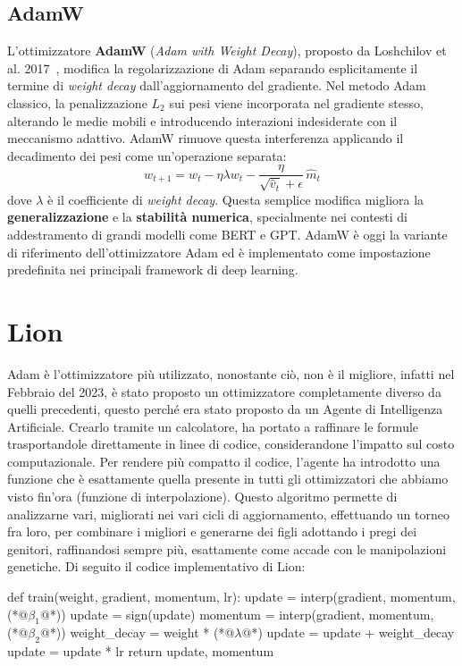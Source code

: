 \subsection{AdamW}

L’ottimizzatore \textbf{AdamW} (\emph{Adam with Weight Decay}), proposto da Loshchilov et al. 2017~\cite{LoshchilovHutter2017AdamW}, modifica la regolarizzazione di Adam separando esplicitamente il termine di \textit{weight decay} dall’aggiornamento del gradiente. Nel metodo Adam classico, la penalizzazione $L_2$ sui pesi viene incorporata nel gradiente stesso, alterando le medie mobili e introducendo interazioni indesiderate con il meccanismo adattivo. AdamW rimuove questa interferenza applicando il decadimento dei pesi come un’operazione separata:
\[
w_{t+1} = w_t - \eta \lambda w_t - \frac{\eta}{\sqrt{\hat{v}_t} + \epsilon} \, \hat{m}_t
\]
dove $\lambda$ è il coefficiente di \emph{weight decay}. Questa semplice modifica migliora la \textbf{generalizzazione} e la \textbf{stabilità numerica}, specialmente nei contesti di addestramento di grandi modelli come BERT e GPT. AdamW è oggi la variante di riferimento dell’ottimizzatore Adam ed è implementato come impostazione predefinita nei principali framework di deep learning.

\section{Lion}
Adam è l'ottimizzatore più utilizzato, nonostante ciò, non è il migliore, infatti nel Febbraio del 2023, è stato proposto un ottimizzatore completamente diverso da quelli precedenti, questo perché era stato proposto da un Agente di Intelligenza Artificiale. Crearlo tramite un calcolatore, ha portato a raffinare le formule trasportandole direttamente in linee di codice, considerandone l'impatto sul costo computazionale. Per rendere più compatto il codice, l'agente ha introdotto una funzione che è esattamente quella presente in tutti gli ottimizzatori che abbiamo visto fin'ora (funzione di interpolazione). Questo algoritmo permette di analizzarne vari, migliorati nei vari cicli di aggiornamento, effettuando un torneo fra loro, per combinare i migliori e generarne dei figli adottando i pregi dei genitori, raffinandosi sempre più, esattamente come accade con le manipolazioni genetiche. Di seguito il codice implementativo di Lion:

\begin{python}[frame=trBL] 
    def train(weight, gradient, momentum, lr): 
        update = interp(gradient, momentum, (*@$\beta_1$@*)) 
        update = sign(update) 
        momentum = interp(gradient, momentum, (*@$\beta_2$@*))
        weight_decay = weight * (*@$\lambda$@*) 
        update = update + weight_decay 
        update = update * lr 
    return update, momentum 
\end{python}

